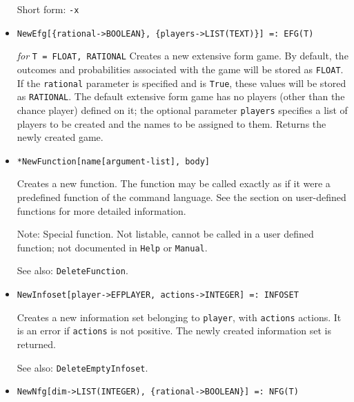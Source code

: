 \begin{itemize}
{\it for} {\tt T = FLOAT, INTEGER, RATIONAL}
\bd
Returns $-x$.
\item
[Short form:] \verb+-x+
\ed

\item{}
\protect \large \begin{verbatim} 
NewEfg[{rational->BOOLEAN}, {players->LIST(TEXT)}] =: EFG(T)
\end{verbatim}\normalsize

{\it for} {\tt T = FLOAT, RATIONAL}
\bd
Creates a new extensive form game.  By default, the
outcomes and probabilities associated with the game will be stored as
{\tt FLOAT}.  If the \verb+rational+ parameter is specified and is \verb+True+,
these values will be stored as {\tt RATIONAL}.  The default extensive form
game has no players (other than the chance player) defined on it; the
optional parameter \verb+players+ specifies a list of players to be
created and the names to be assigned to them.  Returns the newly created game.
\ed

\item{}   
\protect \large \begin{verbatim}
*NewFunction[name[argument-list], body]
\end{verbatim}\normalsize

\bd
Creates a new function.  The function may be called exactly
as if it were a predefined function of the command language.  See the
section on user-defined functions for more detailed information.
\item [Note:]  Special function.  Not listable, cannot be called in a
user defined function; not documented in \verb+Help+ or \verb+Manual+.  
\item [See also:] \verb+DeleteFunction+.
\ed

\item{}
\protect \large \begin{verbatim} 
NewInfoset[player->EFPLAYER, actions->INTEGER] =: INFOSET
\end{verbatim}\normalsize

\bd
Creates a new information set belonging to \verb+player+, with
\verb+actions+ actions.  It is an error if \verb+actions+ is not
positive.  The newly created information set is returned.
\item [See also:] \verb+DeleteEmptyInfoset+.
\ed

\item{}
\protect \large \begin{verbatim}
NewNfg[dim->LIST(INTEGER), {rational->BOOLEAN}] =: NFG(T)
\end{verbatim}\normalsize


\end{itemize}
